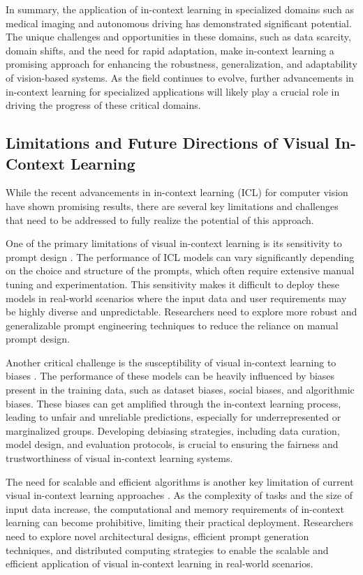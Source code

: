\documentclass[11pt]{article}
\begin{document}
In summary, the application of in-context learning in specialized domains such as medical imaging and autonomous driving has demonstrated significant potential. The unique challenges and opportunities in these domains, such as data scarcity, domain shifts, and the need for rapid adaptation, make in-context learning a promising approach for enhancing the robustness, generalization, and adaptability of vision-based systems. As the field continues to evolve, further advancements in in-context learning for specialized applications will likely play a crucial role in driving the progress of these critical domains.

\subsection{Limitations and Future Directions of Visual In-Context Learning}

While the recent advancements in in-context learning (ICL) for computer vision have shown promising results, there are several key limitations and challenges that need to be addressed to fully realize the potential of this approach.

One of the primary limitations of visual in-context learning is its sensitivity to prompt design \cite{ref148,ref24}. The performance of ICL models can vary significantly depending on the choice and structure of the prompts, which often require extensive manual tuning and experimentation. This sensitivity makes it difficult to deploy these models in real-world scenarios where the input data and user requirements may be highly diverse and unpredictable. Researchers need to explore more robust and generalizable prompt engineering techniques to reduce the reliance on manual prompt design.

Another critical challenge is the susceptibility of visual in-context learning to biases \cite{ref260}. The performance of these models can be heavily influenced by biases present in the training data, such as dataset biases, social biases, and algorithmic biases. These biases can get amplified through the in-context learning process, leading to unfair and unreliable predictions, especially for underrepresented or marginalized groups. Developing debiasing strategies, including data curation, model design, and evaluation protocols, is crucial to ensuring the fairness and trustworthiness of visual in-context learning systems.

The need for scalable and efficient algorithms is another key limitation of current visual in-context learning approaches \cite{ref148,ref24}. As the complexity of tasks and the size of input data increase, the computational and memory requirements of in-context learning can become prohibitive, limiting their practical deployment. Researchers need to explore novel architectural designs, efficient prompt generation techniques, and distributed computing strategies to enable the scalable and efficient application of visual in-context learning in real-world scenarios.
\end{document}
